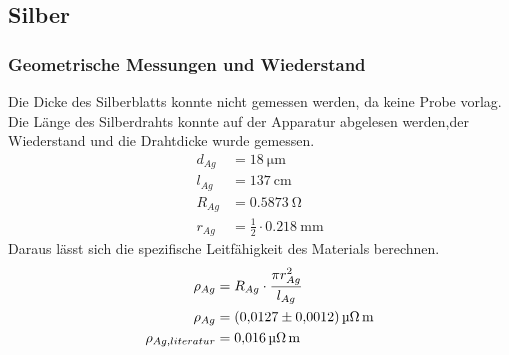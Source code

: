 

\subsection{Silber}
\subsubsection{Geometrische Messungen und Wiederstand}
Die Dicke des Silberblatts konnte nicht gemessen werden, da keine Probe vorlag.
Die Länge des Silberdrahts konnte auf der Apparatur abgelesen werden,der Wiederstand und die Drahtdicke wurde gemessen.
\begin{align*}
    d_{Ag} &= \SI{18}{\micro \meter} \\
    l_{Ag} &= \SI{137}{\centi \meter}\\
    R_{Ag} &= \SI{0.5873}{\ohm}\\
    r_{Ag} &= \frac{1}{2}\cdot \SI{0,218}{\milli \meter}
\end{align*}
Daraus lässt sich die spezifische Leitfähigkeit des Materials berechnen.
\begin{align*}
    \rho_{Ag} &= R_{Ag}\cdot \frac{\pi r_{Ag}^2}{l_{Ag}}\\
    \rho_{Ag} &= \SI{0,0127 \pm 0,0012}{\micro \ohm \meter}\\
    \rho_{Ag,literatur} &= \SI{0,016}{\micro \ohm \meter} %
\end{align*}

